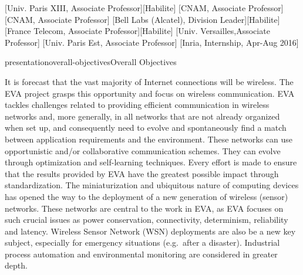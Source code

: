 \documentclass{ra2016}
\begin{document}
\begin{composition}
    [Univ. Paris XIII, Associate Professor][Habilite]
    [CNAM,  Associate Professor]
    [CNAM, Associate Professor]
    [Bell Labs (Alcatel), Division Leader][Habilite]
    [France Telecom, Associate Professor][Habilite]
    [Univ. Versailles,Associate Professor]
    [Univ. Paris Est, Associate Professor]
    [Inria, Internship, Apr-Aug 2016]
\end{composition}



%

\begin{module}{presentation}{overall-objectives}{Overall Objectives}

It is forecast that the vast majority of Internet connections will be wireless.
The EVA project grasps this opportunity and focus on wireless communication.
EVA tackles challenges related to providing efficient communication in wireless networks and, more generally, in all networks that are not already organized when set up, and consequently need to evolve and spontaneously find a match between application requirements and the environment.
These networks can use opportunistic and/or collaborative communication schemes.
They can evolve through optimization and self-learning techniques.
Every effort is made to ensure that the results provided by EVA have the greatest possible impact through standardization.
The miniaturization and ubiquitous nature of computing devices has opened the way to the deployment of a new generation of wireless (sensor) networks.
These networks are central to the work in EVA, as EVA focuses on such crucial issues as power conservation, connectivity, determinism, reliability and latency.
Wireless Sensor Network (WSN) deployments are also be a new key subject, especially for emergency situations (e.g.~after a disaster).
Industrial process automation and environmental monitoring are considered in greater depth.

\end{module}
\end{document}
